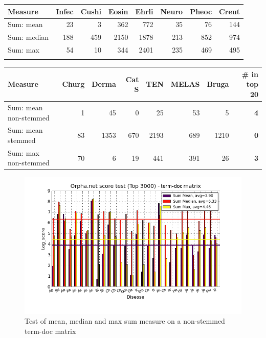 \begin{table}[H]
  \begin{tiny}
    \begin{tabular}{|l|r|r|r|r|r|r|r|}
      \hline
      Measure &Infec&Cushi&Eosin&Ehrli&Neuro&Pheoc&Creut \\
      \hline
      Sum: mean &23&3&362&772&35&76&144 \\
      \hline
      Sum: median &188&459&2150&1878&213&852&974 \\
      \hline
      Sum: max &54&10&344&2401&235&469&495  \\
      \hline
      \multicolumn{8}{c}{} \\
    \end{tabular}
    \begin{tabular}{|l|r|r|r|r|r|r|r|}
      \hline
      Measure &Churg&Derma&Cat S&TEN&MELAS&Bruga& \scriptsize{\textbf{\# in top 20}} \\
      \hline
      Sum: mean non-stemmed &1&45&0&25&53&5& \scriptsize{\textbf{4}} \\
      \hline
      Sum: mean stemmed &83&1353&670&2193&689&1210 &  \scriptsize{\textbf{0}}\\
      \hline
      Sum: max non-stemmed &70&6&19&441&391&26 & \scriptsize{\textbf{3}} \\
      \hline
    \end{tabular}
  \end{tiny}
\end{table}

\begin{figure}[H]
  \caption{Test of mean, median and max sum measure on a non-stemmed term-doc matrix}
  \begin{center}
    \includegraphics[width=1.2\textwidth]{barcharts/termDoc_orphan_hist_3000_ns_mea_med_max_sum.png}
  \end{center}
  \label{termDoc_orphan_hist_3000_ns_mea_med_max_sum}
\end{figure}

